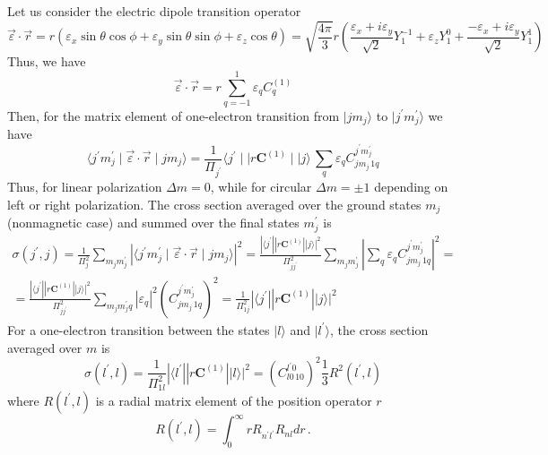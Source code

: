 \documentclass[a4paper,oneside,12pt]{extarticle}
\begin{document}
Let us consider the electric dipole transition operator
\begin{equation}
\vec{\varepsilon} \cdot \vec{r} = 
r(\varepsilon_x \sin\theta\cos\phi + \varepsilon_y \sin\theta\sin\phi + \varepsilon_z \cos\theta) = 
\sqrt{\frac{4\pi}{3}} r \left(
\frac{\varepsilon_x + i\varepsilon_y}{\sqrt{2}} Y_1^{-1} +
\varepsilon_z Y_1^{0} +
\frac{-\varepsilon_x + i\varepsilon_y}{\sqrt{2}} Y_1^{1}
\right)
\label{eq:expansion}
\end{equation}
%
Thus, we have
%
$$
\vec{\varepsilon} \cdot \vec{r} = 
r \sum_{q=-1}^1 \varepsilon_q C_{q}^{(1)}
$$
%
Then, for the matrix element of one-electron transition from $|j m_j\rangle$ to $|j^{\prime} m_j^{\prime}\rangle$ we have
%
$$
\langle j^{\prime} m_j^{\prime} \mid \vec{\varepsilon} \cdot \vec{r} \mid j m_j \rangle = 
\frac{1}{\Pi_{j^{\prime}}}
\langle j^{\prime} \mid\mid r\mathbf{C}^{(1)} \mid\mid j \rangle  \,
\sum_q  \varepsilon_q C_{j m_j \, 1 q}^{j^{\prime} m_j^{\prime}}
$$
Thus, for linear polarization $\Delta m=0$, while for circular $\Delta m=\pm 1$ depending on left or right polarization.
The cross section averaged over the ground states $m_j$ (nonmagnetic case) and summed over the final states $m_j^{\prime}$ is
\begin{multline}
\sigma(j^{\prime},j) = \frac{1}{\Pi_j^2} \sum_{m_j m_j^{\prime}}
|\langle j^{\prime} m_j^{\prime} \mid \vec{\varepsilon} \cdot \vec{r} \mid j m_j \rangle |^2 = 
\frac{|\langle j^{\prime} || r\mathbf{C}^{(1)} || j \rangle|^2}{\Pi_{jj^{\prime}}^2}  
\sum_{m_j m_j^{\prime}} \left| \sum_{q} \varepsilon_q
C_{j m_j \, 1 q}^{j^{\prime} m_j^{\prime}}\right|^2 = \\
= \frac{|\langle j^{\prime} || r\mathbf{C}^{(1)} || j \rangle|^2}{\Pi_{jj^{\prime}}^2}  
\sum_{m_j m_j^{\prime}q} |\varepsilon_q|^2
\left(C_{j m_j \, 1 q}^{j^{\prime} m_j^{\prime}}\right)^2
= \frac{1}{\Pi_{1 j}^2} |\langle j^{\prime} || r\mathbf{C}^{(1)} || j \rangle|^2
\end{multline}
%
For a one-electron transition between the states $|l\rangle$ and $|l^{\prime}\rangle$, the cross section averaged over $m$ is
\begin{equation}
\sigma(l^{\prime},l) = 
\frac{1}{\Pi_{1 l}^2} |\langle l^{\prime} || r\mathbf{C}^{(1)} || l \rangle|^2 =
\left(C_{l 0 \, 1 0}^{l^{\prime} 0} \right)^2 \frac{1}{3} R^2(l^{\prime},l)
\label{eq:sigma_1}
\end{equation}
%
where $R(l^{\prime},l)$ is a radial matrix element of the position operator $r$
$$
R(l^{\prime},l) = \int_0^{\infty} r R_{n^{\prime}l^{\prime}} R_{nl} dr \,.
$$
\end{document}
